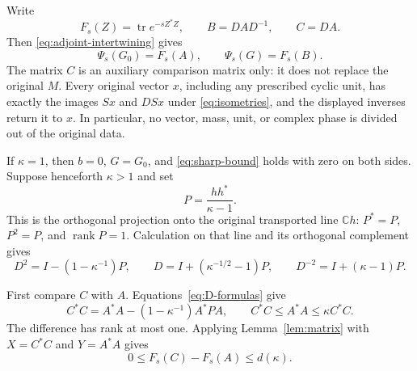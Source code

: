 \documentclass[11pt]{article}
\newcommand{\tr}{\operatorname{tr}}
\newcommand{\rank}{\operatorname{rank}}
\begin{document}
Write
\[
 F_s(Z)=\tr e^{-sZ^*Z},\qquad B=DAD^{-1},\qquad C=DA.
\]
Then \eqref{eq:adjoint-intertwining} gives
\begin{equation}\label{eq:trace-identities}
 \Psi_s(G_0)=F_s(A),\qquad \Psi_s(G)=F_s(B).
\end{equation}
The matrix $C$ is an auxiliary comparison matrix only: it does not
replace the original $M$. Every original vector $x$, including any
prescribed cyclic unit, has exactly the images $Sx$ and $DSx$ under
\eqref{eq:isometries}, and the displayed inverses return it to $x$.
In particular, no vector, mass, unit, or complex phase is divided
out of the original data.

If $\kappa=1$, then $b=0$, $G=G_0$, and \eqref{eq:sharp-bound}
holds with zero on both sides. Suppose henceforth $\kappa>1$ and set
\begin{equation}\label{eq:rankone-projector}
 P=\frac{hh^*}{\kappa-1}.
\end{equation}
This is the orthogonal projection onto the original transported
line $\mathbb Ch$: $P^*=P$, $P^2=P$, and $\rank P=1$.
Calculation on that line and its orthogonal complement gives
\begin{equation}\label{eq:D-formulas}
 D^2=I-(1-\kappa^{-1})P,\qquad
 D=I+(\kappa^{-1/2}-1)P,\qquad
 D^{-2}=I+(\kappa-1)P.
\end{equation}

First compare $C$ with $A$. Equations~\eqref{eq:D-formulas} give
\begin{equation}\label{eq:left-comparison}
 C^*C=A^*A-(1-\kappa^{-1})A^*PA,
 \qquad C^*C\leq A^*A\leq\kappa C^*C.
\end{equation}
The difference has rank at most one. Applying
Lemma~\ref{lem:matrix} with $X=C^*C$ and $Y=A^*A$ gives
\begin{equation}\label{eq:first-gap}
 0\leq F_s(C)-F_s(A)\leq d(\kappa).
\end{equation}
\end{document}

